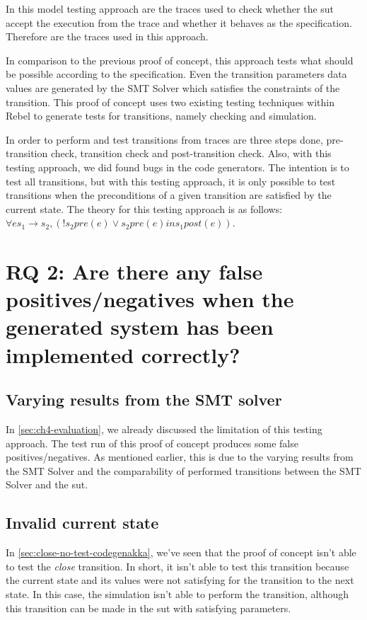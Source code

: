 In this model testing approach are the traces used to check whether the \gls{sut} accept the execution from the trace and whether it behaves as the specification. Therefore are the traces used in this approach.

In comparison to the previous proof of concept, this approach tests what should be possible according to the specification. Even the transition parameters data values are generated by the SMT Solver which satisfies the constraints of the transition. This proof of concept uses two existing testing techniques within Rebel to generate tests for transitions, namely checking and simulation.

In order to perform and test transitions from traces are three steps done, pre-transition check, transition check and post-transition check. Also, with this testing approach, we did found bugs in the code generators. The intention is to test all transitions, but with this testing approach, it is only possible to test transitions when the preconditions of a given transition are satisfied by the current state. The theory for this testing approach is as follows: $\forall e s_{1} \to s_{2}, (! s_{2} pre(e) \lor s_{2} pre(e) in s_{1} post(e))$.

\section{RQ 2: Are there any false positives/negatives when the generated system has been implemented correctly?}

\subsection{Varying results from the SMT solver}
In \autoref{sec:ch4-evaluation}, we already discussed the limitation of this testing approach. The test run of this proof of concept produces some false positives/negatives. As mentioned earlier, this is due to the varying results from the SMT Solver and the comparability of performed transitions between the SMT Solver and the \gls{sut}.


\subsection{Invalid current state}
In \autoref{sec:close-no-test-codegenakka}, we've seen that the proof of concept isn't able to test the \textit{close} transition. In short, it isn't able to test this transition because the current state and its values were not satisfying for the transition to the next state. In this case, the simulation isn't able to perform the transition, although this transition can be made in the \gls{sut} with satisfying parameters.

